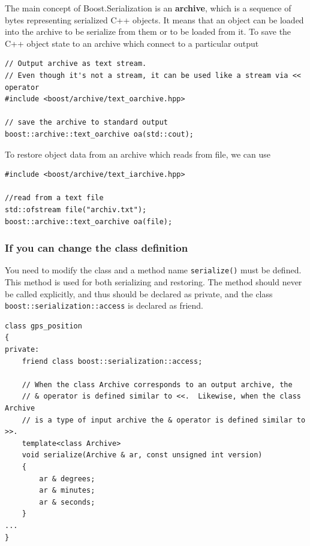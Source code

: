 The main concept of Boost.Serialization is an {\bf archive}, which is a sequence
of bytes representing serialized C++ objects. It means that an object can be
loaded into the archive to be serialize from them or to be loaded from it. 
To save the C++ object state to an archive which connect to a particular output
\begin{verbatim}
// Output archive as text stream.
// Even though it's not a stream, it can be used like a stream via << operator
#include <boost/archive/text_oarchive.hpp> 

// save the archive to standard output
boost::archive::text_oarchive oa(std::cout); 
\end{verbatim}


To restore object data from an archive which reads from file, we can use
\begin{verbatim}
#include <boost/archive/text_iarchive.hpp> 

//read from a text file
std::ofstream file("archiv.txt"); 
boost::archive::text_oarchive oa(file); 
\end{verbatim}


\subsubsection{If you can change the class definition}

You need to modify the class and a method name \verb!serialize()! must be
defined. This method is used for both serializing and restoring. The method
should never be called explicitly, and thus should be declared as private, and
the class \verb!boost::serialization::access! is declared as friend.

\begin{verbatim}
class gps_position
{
private:
    friend class boost::serialization::access;
    
    // When the class Archive corresponds to an output archive, the
    // & operator is defined similar to <<.  Likewise, when the class Archive
    // is a type of input archive the & operator is defined similar to >>.
    template<class Archive>
    void serialize(Archive & ar, const unsigned int version)
    {
        ar & degrees;
        ar & minutes;
        ar & seconds;
    }
...
}
\end{verbatim}

